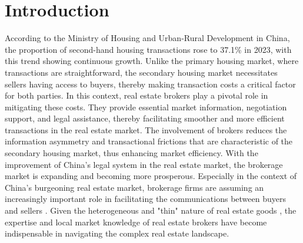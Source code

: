 \documentclass[11pt]{article}
\begin{document}
\clearpage
\egroup
\setcounter{page}{1}



\section{Introduction \label{sec:introduction}}

\noindent


According to the Ministry of Housing and Urban-Rural Development in China, the proportion of second-hand housing transactions rose to 37.1\% in 2023, with this trend showing continuous growth. Unlike the primary housing market, where transactions are straightforward, the secondary housing market necessitates sellers having access to buyers, thereby making transaction costs a critical factor for both parties. In this context, real estate brokers play a pivotal role in mitigating these costs. They provide essential market information, negotiation support, and legal assistance, thereby facilitating smoother and more efficient transactions in the real estate market. The involvement of brokers reduces the information asymmetry and transactional frictions that are characteristic of the secondary housing market, thus enhancing market efficiency. With the improvement of China's legal system in the real estate market, the brokerage market is expanding and becoming more prosperous. Especially in the context of China's burgeoning real estate market, brokerage firms are assuming an increasingly important role in facilitating the communications between buyers and sellers \citep{glaeser_real_2017}. Given the heterogeneous and "thin" nature of real estate goods \citep{HAN2015813}, the expertise and local market knowledge of real estate brokers have become indispensable in navigating the complex real estate landscape.
\end{document}
